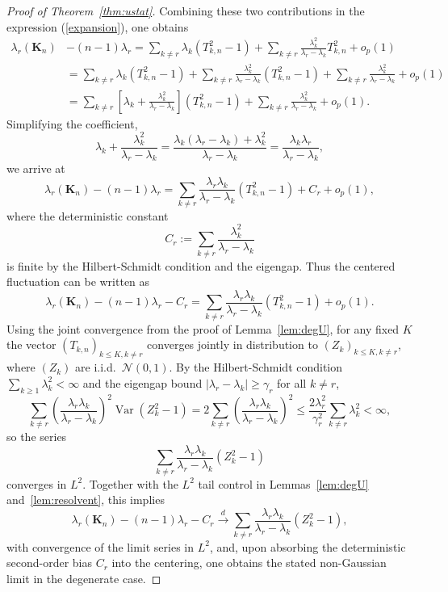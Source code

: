 \documentclass[11pt]{article}
\theoremstyle{plain}
\theoremstyle{remark}
\DeclareMathOperator{\Var}{Var}
\begin{document}
\begin{proof}[Proof of Theorem~\ref{thm:ustat}]
Combining these two contributions in the expression 
(\ref{expansion}), one obtains
\begin{align*}
\lambda_r(\mathbf{K}_n) &- (n-1)\lambda_r 
= \sum_{k \neq r}\lambda_k(T_{k,n}^2 - 1)
+ \sum_{k \neq r}\frac{\lambda_k^2}{\lambda_r - \lambda_k}T_{k,n}^2 + o_p(1) \\
&= \sum_{k \neq r}\lambda_k(T_{k,n}^2 - 1)
   + \sum_{k\neq r}\frac{\lambda_k^2}{\lambda_r-\lambda_k}(T_{k,n}^2-1)
   + \sum_{k\neq r}\frac{\lambda_k^2}{\lambda_r-\lambda_k}
   + o_p(1) \\
&= \sum_{k \neq r}\left[\lambda_k + \frac{\lambda_k^2}{\lambda_r - \lambda_k}\right](T_{k,n}^2-1)
   + \sum_{k\neq r}\frac{\lambda_k^2}{\lambda_r-\lambda_k}
   + o_p(1).
\end{align*}
Simplifying the coefficient,
\[
\lambda_k + \frac{\lambda_k^2}{\lambda_r - \lambda_k}
= \frac{\lambda_k(\lambda_r - \lambda_k) + \lambda_k^2}{\lambda_r - \lambda_k}
= \frac{\lambda_k\lambda_r}{\lambda_r - \lambda_k},
\]
we arrive at
\[
\lambda_r(\mathbf{K}_n) - (n-1)\lambda_r
=
\sum_{k \neq r}\frac{\lambda_r\lambda_k}{\lambda_r - \lambda_k}(T_{k,n}^2 - 1)
+ C_r + o_p(1),
\]
where the deterministic constant
\[
C_r := \sum_{k\neq r}\frac{\lambda_k^2}{\lambda_r-\lambda_k}
\]
is finite by the Hilbert-Schmidt condition and the eigengap. Thus the centered fluctuation can be written as
\[
\lambda_r(\mathbf{K}_n) - (n-1)\lambda_r - C_r
=
\sum_{k \neq r}\frac{\lambda_r\lambda_k}{\lambda_r - \lambda_k}(T_{k,n}^2 - 1)
+ o_p(1).
\]
Using the joint convergence from the proof of Lemma~\ref{lem:degU}, for any fixed $K$ the vector
$(T_{k,n})_{k \le K, k \neq r}$ converges jointly in distribution to $(Z_k)_{k \le K, k \neq r}$,
where $(Z_k)$ are i.i.d.\ $\mathcal{N}(0,1)$. By the Hilbert-Schmidt condition
$\sum_{k \ge 1}\lambda_k^2 < \infty$ and the eigengap bound $|\lambda_r - \lambda_k| \ge \gamma_r$
for all $k \neq r$,
\[
\sum_{k \neq r}\left(\frac{\lambda_r\lambda_k}{\lambda_r - \lambda_k}\right)^2\Var(Z_k^2-1)
=
2\sum_{k \neq r}\left(\frac{\lambda_r\lambda_k}{\lambda_r - \lambda_k}\right)^2
\le
\frac{2\lambda_r^2}{\gamma_r^2}\sum_{k\neq r}\lambda_k^2
<\infty,
\]
so the series
\[
\sum_{k \neq r}\frac{\lambda_r\lambda_k}{\lambda_r - \lambda_k}(Z_k^2 - 1)
\]
converges in $L^2$. Together with the $L^2$ tail control in Lemmas~\ref{lem:degU} and~\ref{lem:resolvent}, this implies
\[
\lambda_r(\mathbf{K}_n) - (n-1)\lambda_r - C_r
\xrightarrow{d}
\sum_{k \neq r}\frac{\lambda_r\lambda_k}{\lambda_r - \lambda_k}(Z_k^2 - 1),
\]
with convergence of the limit series in $L^2$, and, upon absorbing the deterministic second-order bias $C_r$ into the centering, one obtains the stated non-Gaussian limit in the degenerate case.


\end{proof}
\end{document}
